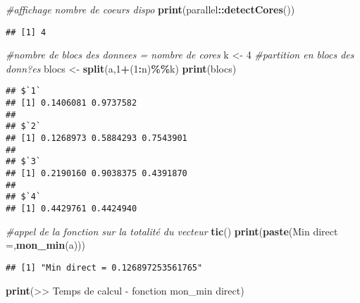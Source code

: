 \documentclass[
]{article}
\newenvironment{Shaded}{\begin{snugshade}}{\end{snugshade}}
\newcommand{\CommentTok}[1]{\textcolor[rgb]{0.56,0.35,0.01}{\textit{#1}}}
\newcommand{\DecValTok}[1]{\textcolor[rgb]{0.00,0.00,0.81}{#1}}
\newcommand{\FunctionTok}[1]{\textcolor[rgb]{0.13,0.29,0.53}{\textbf{#1}}}
\newcommand{\NormalTok}[1]{#1}
\newcommand{\OtherTok}[1]{\textcolor[rgb]{0.56,0.35,0.01}{#1}}
\newcommand{\SpecialCharTok}[1]{\textcolor[rgb]{0.81,0.36,0.00}{\textbf{#1}}}
\newcommand{\StringTok}[1]{\textcolor[rgb]{0.31,0.60,0.02}{#1}}
\begin{document}
\begin{Shaded}
\begin{Highlighting}[]
\CommentTok{\#affichage nombre de coeurs dispo}
\FunctionTok{print}\NormalTok{(parallel}\SpecialCharTok{::}\FunctionTok{detectCores}\NormalTok{())}
\end{Highlighting}
\end{Shaded}

\begin{verbatim}
## [1] 4
\end{verbatim}

\begin{Shaded}
\begin{Highlighting}[]
\CommentTok{\#nombre de blocs des donnees = nombre de cores}
\NormalTok{k }\OtherTok{\textless{}{-}} \DecValTok{4}
\CommentTok{\#partition en blocs des donn?es}
\NormalTok{blocs }\OtherTok{\textless{}{-}} \FunctionTok{split}\NormalTok{(a,}\DecValTok{1}\SpecialCharTok{+}\NormalTok{(}\DecValTok{1}\SpecialCharTok{:}\NormalTok{n)}\SpecialCharTok{\%\%}\NormalTok{k)}
\FunctionTok{print}\NormalTok{(blocs)}
\end{Highlighting}
\end{Shaded}

\begin{verbatim}
## $`1`
## [1] 0.1406081 0.9737582
## 
## $`2`
## [1] 0.1268973 0.5884293 0.7543901
## 
## $`3`
## [1] 0.2190160 0.9038375 0.4391870
## 
## $`4`
## [1] 0.4429761 0.4424940
\end{verbatim}

\begin{Shaded}
\begin{Highlighting}[]
\CommentTok{\#appel de la fonction sur la totalité du vecteur}
\FunctionTok{tic}\NormalTok{()}
\FunctionTok{print}\NormalTok{(}\FunctionTok{paste}\NormalTok{(}\StringTok{\textquotesingle{}Min direct =\textquotesingle{}}\NormalTok{,}\FunctionTok{mon\_min}\NormalTok{(a)))}
\end{Highlighting}
\end{Shaded}

\begin{verbatim}
## [1] "Min direct = 0.126897253561765"
\end{verbatim}

\begin{Shaded}
\begin{Highlighting}[]
\FunctionTok{print}\NormalTok{(}\StringTok{\textquotesingle{}\textgreater{}\textgreater{} Temps de calcul {-} fonction mon\_min direct\textquotesingle{}}\NormalTok{)}
\end{Highlighting}
\end{Shaded}
\end{document}
